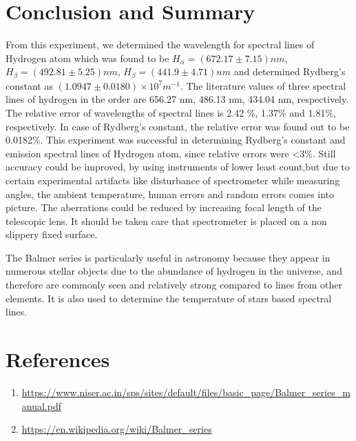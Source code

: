 \documentclass[a4paper, amsfonts, amssymb, amsmath, reprint, showkeys, nofootinbib, twoside]{revtex4-1}
\begin{document}
\section{Conclusion and Summary}
From this experiment, we determined the wavelength for spectral lines of Hydrogen atom which was found to be $H_\alpha=(672.17\pm7.15) nm$, $H_\beta=(492.81\pm5.25) nm$, $H_\beta=(441.9\pm4.71) nm$ and determined Rydberg's constant as $(1.0947\pm0.0180)\times 10^7 m^{-1}$. The literature values of three spectral lines of hydrogen in the order are 656.27 nm, 486.13 nm, 434.04 nm, respectively. The relative error of wavelengths of spectral lines is 2.42 \%, 1.37\% and 1.81\%, respectively. In case of Rydberg's constant, the relative error was found out to be 0.0182\%. This experiment was successful in determining Rydberg's constant and emission spectral lines of Hydrogen atom, since relative errors were <3\%. Still accuracy could be improved, by using instruments of lower least count,but due to certain experimental artifacts like disturbance of spectrometer while measuring angles, the ambient temperature, human errors and random errors comes into picture. The aberrations could be reduced by increasing focal length of the telescopic lens. It should be taken care that spectrometer is placed on a non slippery fixed surface.

The Balmer series is particularly useful in astronomy because they appear in numerous stellar objects due to the abundance of hydrogen in the universe, and therefore are commonly seen and relatively strong compared to lines from other elements. It is also used to determine the temperature of stars based spectral lines.

\section{References}
\begin{enumerate}
	\item {\url{https://www.niser.ac.in/sps/sites/default/files/basic_page/Balmer_series_manual.pdf}}
	\item {\url{https://en.wikipedia.org/wiki/Balmer_series}}
\end{enumerate}
\end{document}
